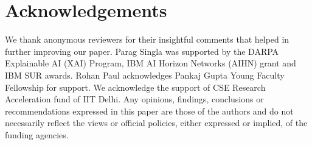\section{Acknowledgements}
We thank anonymous reviewers for their insightful comments that helped in further improving our paper.
Parag Singla was supported by the DARPA Explainable AI (XAI) Program,
IBM AI Horizon Networks (AIHN) grant and
IBM SUR awards.
Rohan Paul acknowledges Pankaj Gupta Young Faculty Fellowship for support. 
We acknowledge the support of CSE Research Acceleration fund of IIT Delhi. Any opinions, findings, conclusions or recommendations
expressed in this paper are those of the authors and do
not necessarily reflect the views or official policies, either expressed or implied, of the funding agencies.
